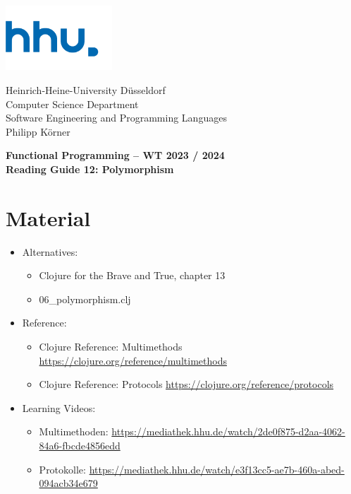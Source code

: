 \documentclass[11pt,a4paper]{article}
\begin{document}
\begin{minipage}[b]{\textwidth}
	\parbox[t]{5cm}{%
		\includegraphics[width=4cm]{unilogo}
		\hfill
	}
	\parbox[b]{11cm}{%
		Heinrich-Heine-University D\"usseldorf\\
		Computer Science Department\\
		Software Engineering and Programming Languages\\
		Philipp K\"orner
	}
\end{minipage}
\begin{center}
	\bf
	Functional Programming -- WT 2023 / 2024\\
	Reading Guide 12: Polymorphism
\end{center}

\pagestyle{empty}

\section{Material} 

\begin{itemize}
    \item Alternatives:
        \begin{itemize}
\item Clojure for the Brave and True, chapter 13
\item 06\_polymorphism.clj
        \end{itemize}
    \item Reference:
        \begin{itemize}
\item Clojure Reference: Multimethods \url{https://clojure.org/reference/multimethods}
\item Clojure Reference: Protocols \url{https://clojure.org/reference/protocols}
        \end{itemize}
    \item Learning Videos:
        \begin{itemize}
            \item Multimethoden: \url{https://mediathek.hhu.de/watch/2de0f875-d2aa-4062-84a6-fbcde4856edd}
            \item Protokolle: \url{https://mediathek.hhu.de/watch/e3f13cc5-ae7b-460a-abed-094acb34e679}
        \end{itemize}
\end{itemize}
\end{document}
